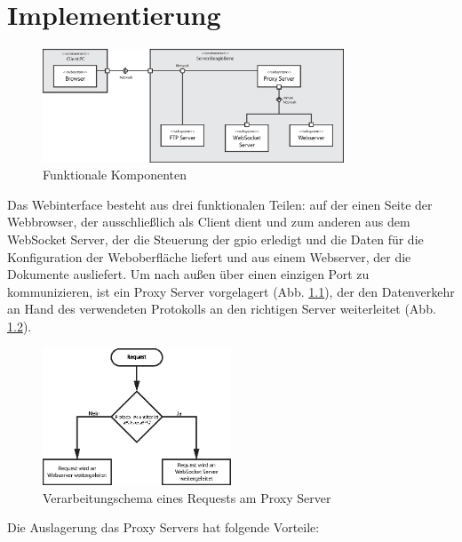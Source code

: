 \chapter{Implementierung}

\begin{figure}[ht]
\centering
\includegraphics[width = 0.8\textwidth]{dokumentation/images/components.eps}
\caption{Funktionale Komponenten}
\label{fig:functionalComponents}
\end{figure}

Das Webinterface besteht aus drei funktionalen Teilen: auf der einen Seite der Webbrowser, der ausschließlich als Client dient und zum anderen aus dem WebSocket Server, der die Steuerung der \gls{gpio} erledigt und die Daten für die Konfiguration der Weboberfläche liefert und aus einem Webserver, der die Dokumente ausliefert. Um nach außen über einen einzigen Port zu kommunizieren, ist ein Proxy Server vorgelagert (Abb. \ref{fig:functionalComponents}), der den Datenverkehr an Hand des verwendeten Protokolls an den richtigen Server weiterleitet (Abb. \ref{fig:requestForwarding}).

\begin{figure}[ht]
\centering
\includegraphics[width = 0.5\textwidth]{dokumentation/images/request.eps}
\caption{Verarbeitungschema eines Requests am Proxy Server}
\label{fig:requestForwarding}
\end{figure}

\noindent Die Auslagerung das Proxy Servers hat folgende Vorteile:

